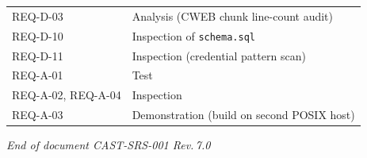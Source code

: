 \documentclass[12pt]{article}
\begin{document}
\begin{center}
\begin{longtable}{ll}
  REQ-D-03                 & Analysis (CWEB chunk line-count audit) \\
  REQ-D-10                 & Inspection of \texttt{schema.sql} \\
  REQ-D-11                 & Inspection (credential pattern scan) \\
  REQ-A-01                 & Test \\
  REQ-A-02, REQ-A-04       & Inspection \\
  REQ-A-03                 & Demonstration (build on second POSIX host) \\
  \bottomrule
\end{longtable}
\end{center}

\vfill
\begin{center}
  \small\textit{End of document CAST-SRS-001 Rev.\,7.0}
\end{center}
\end{document}
